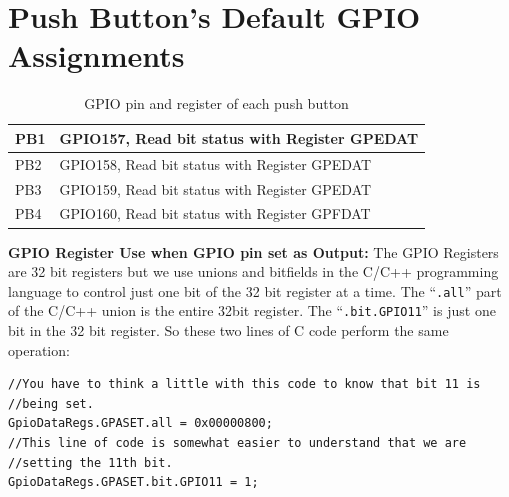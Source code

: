\documentclass[11pt]{article}
\begin{document}
\section*{Push Button’s Default GPIO Assignments}
%
\begin{table}[H]
    \centering
    \renewcommand{\arraystretch}{1.2}
    \begin{tabular}{|>{\centering\arraybackslash}p{}|>{\centering\arraybackslash}p{}|}
        \hline
        PB1 & GPIO157, Read bit status with Register GPEDAT \\ \hline
        PB2 & GPIO158, Read bit status with Register GPEDAT \\ \hline
        PB3 & GPIO159, Read bit status with Register GPEDAT \\ \hline
        PB4 & GPIO160, Read bit status with Register GPFDAT \\ \hline
    \end{tabular}
    \caption{GPIO pin and register of each push button}
\end{table}
%
\textbf{GPIO Register Use when GPIO pin set as Output:} The GPIO Registers are 32 bit registers but we use unions and bitfields in the C/C++ programming language to control just one bit of the 32 bit register at a time. The “\lstinline|.all|” part of the C/C++ union is the entire 32bit register. The “\lstinline|.bit.GPIO11|” is just one bit in the 32 bit register. So these two lines of C code perform the same operation:
%
\begin{verbatim}
//You have to think a little with this code to know that bit 11 is
//being set.
GpioDataRegs.GPASET.all = 0x00000800;
//This line of code is somewhat easier to understand that we are
//setting the 11th bit.
GpioDataRegs.GPASET.bit.GPIO11 = 1;
\end{verbatim}
%
\end{document}
